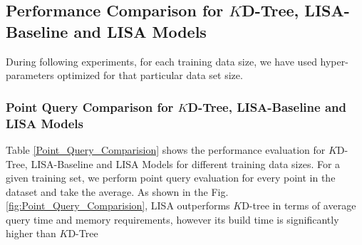 \subsection{Performance Comparison for $K$D-Tree, LISA-Baseline and LISA Models }
During following experiments, for each training data size, we have used hyper-parameters optimized for that particular data set size. 

\subsubsection{Point Query Comparison for $K$D-Tree, LISA-Baseline and LISA Models }
Table \ref{Point_Query_Comparision} shows the performance evaluation for $K$D-Tree, LISA-Baseline and LISA Models for different training data sizes. For a given training set, we perform point query evaluation for every point in the dataset and take the average. As shown in the Fig. \ref{fig:Point_Query_Comparision}, LISA outperforms $K$D-tree in terms of average query time and memory requirements, however its build time is significantly higher than $K$D-Tree 

